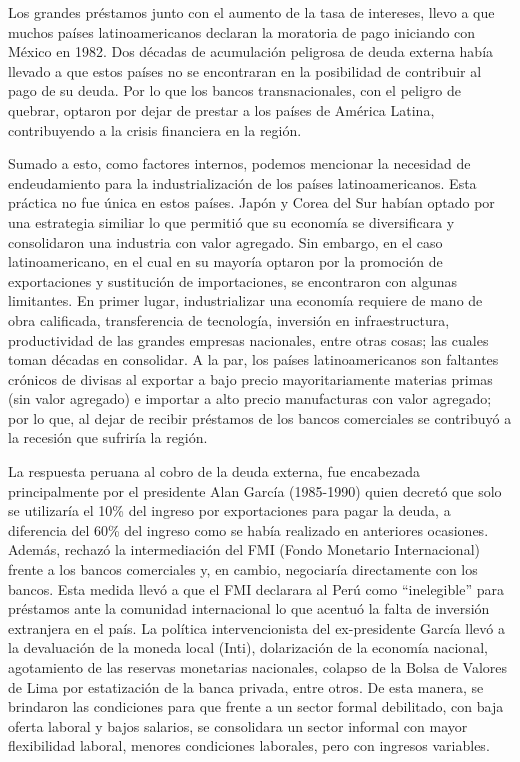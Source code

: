 \documentclass[
  letterpaper,
  12pt,
  oneside,
  spanish,
  doublespacing,
  headsepline,
  parskip]{MastersDoctoralThesis}
\begin{document}
Los grandes préstamos junto con el aumento de la tasa de intereses,
llevo a que muchos países latinoamericanos declaran la moratoria de pago
iniciando con México en 1982. Dos décadas de acumulación peligrosa de
deuda externa había llevado a que estos países no se encontraran en la
posibilidad de contribuir al pago de su deuda. Por lo que los bancos
transnacionales, con el peligro de quebrar, optaron por dejar de prestar
a los países de América Latina, contribuyendo a la crisis financiera en
la región.

Sumado a esto, como factores internos, podemos mencionar la necesidad de
endeudamiento para la industrialización de los países latinoamericanos.
Esta práctica no fue única en estos países. Japón y Corea del Sur habían
optado por una estrategia similiar lo que permitió que su economía se
diversificara y consolidaron una industria con valor agregado. Sin
embargo, en el caso latinoamericano, en el cual en su mayoría optaron
por la promoción de exportaciones y sustitución de importaciones, se
encontraron con algunas limitantes. En primer lugar, industrializar una
economía requiere de mano de obra calificada, transferencia de
tecnología, inversión en infraestructura, productividad de las grandes
empresas nacionales, entre otras cosas; las cuales toman décadas en
consolidar. A la par, los países latinoamericanos son faltantes crónicos
de divisas al exportar a bajo precio mayoritariamente materias primas
(sin valor agregado) e importar a alto precio manufacturas con valor
agregado; por lo que, al dejar de recibir préstamos de los bancos
comerciales se contribuyó a la recesión que sufriría la región.

La respuesta peruana al cobro de la deuda externa, fue encabezada
principalmente por el presidente Alan García (1985-1990) quien decretó
que solo se utilizaría el 10\% del ingreso por exportaciones para pagar
la deuda, a diferencia del 60\% del ingreso como se había realizado en
anteriores ocasiones. Además, rechazó la intermediación del FMI (Fondo
Monetario Internacional) frente a los bancos comerciales y, en cambio,
negociaría directamente con los bancos. Esta medida llevó a que el FMI
declarara al Perú como ``inelegible'' para préstamos ante la comunidad
internacional lo que acentuó la falta de inversión extranjera en el
país. La política intervencionista del ex-presidente García llevó a la
devaluación de la moneda local (Inti), dolarización de la economía
nacional, agotamiento de las reservas monetarias nacionales, colapso de
la Bolsa de Valores de Lima por estatización de la banca privada, entre
otros. De esta manera, se brindaron las condiciones para que frente a un
sector formal debilitado, con baja oferta laboral y bajos salarios, se
consolidara un sector informal con mayor flexibilidad laboral, menores
condiciones laborales, pero con ingresos variables.
\end{document}
